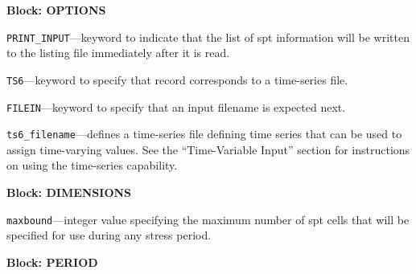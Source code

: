 
\item \textbf{Block: OPTIONS}

\begin{description}
\item \texttt{PRINT\_INPUT}---keyword to indicate that the list of spt information will be written to the listing file immediately after it is read.

\item \texttt{TS6}---keyword to specify that record corresponds to a time-series file.

\item \texttt{FILEIN}---keyword to specify that an input filename is expected next.

\item \texttt{ts6\_filename}---defines a time-series file defining time series that can be used to assign time-varying values. See the ``Time-Variable Input'' section for instructions on using the time-series capability.

\end{description}
\item \textbf{Block: DIMENSIONS}

\begin{description}
\item \texttt{maxbound}---integer value specifying the maximum number of spt cells that will be specified for use during any stress period.

\end{description}
\item \textbf{Block: PERIOD}

